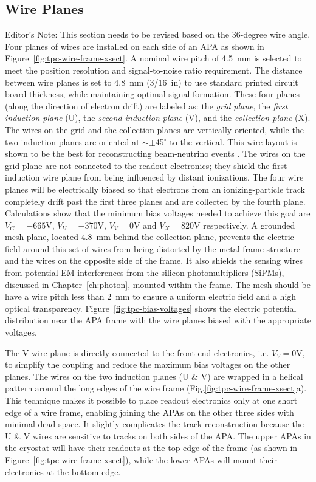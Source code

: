 \subsection{Wire Planes}
\notestart
Editor's Note: This section needs to be revised based on the 36-degree wire angle.
\notestop
Four planes of wires are installed on each side of an APA as shown in Figure~\ref{fig:tpc-wire-frame-xsect}.
A nominal wire pitch of 4.5~mm is selected to meet the position resolution  and signal-to-noise ratio requirement. The distance between wire planes is set to 4.8~mm (3/16~in) to use standard printed circuit board thickness, while maintaining optimal signal formation.  These four planes (along the direction of electron drift) are labeled as: the {\em grid plane}, the {\em first induction plane} (U), the {\em second induction plane} (V), and the {\em collection plane} (X).
The wires on the grid and the collection planes
are vertically oriented, while the two induction planes are oriented 
at $\sim\pm$45$^\circ$ to the vertical. This wire layout is shown to be the best for reconstructing beam-neutrino events \cite{wire-orientation}. The wires on the grid plane are not 
connected to the readout electronics; they shield the first induction wire plane from being influenced by distant ionizations. The four wire planes 
will be electrically biased so that electrons from an ionizing-particle
track completely drift past the first three planes and are collected by the 
fourth plane. Calculations show that the minimum bias voltages 
needed to achieve this goal are $V_G= -665$V, $V_U=-370$V, $V_V=0$V and $V_X=820$V 
respectively.  A grounded mesh plane, located 4.8~mm behind the collection plane, prevents the electric field around this set of wires from being distorted by the metal frame structure and the wires on the opposite side of the frame. It also shields the sensing wires from potential EM interferences from the silicon photomultipliers (SiPMs), discussed in Chapter~\ref{ch:photon}, mounted within the frame.  The mesh should be have a wire pitch less than 2~mm to ensure a uniform electric field and a high optical transparency.  Figure~\ref{fig:tpc-bias-voltages} shows the electric potential distribution near the APA frame with the wire planes biased with the appropriate voltages. 

The V wire plane is directly connected to the front-end electronics, i.e. $V_V=0$V, to simplify the coupling and 
reduce the maximum bias voltages on the other planes. The wires on the two induction planes (U \& V) are wrapped in a helical pattern around the long edges of the wire frame 
(Fig.\ref{fig:tpc-wire-frame-xsect}a). This technique makes it possible to place readout 
electronics only at one short edge of a wire frame, enabling joining the APAs on the other three sides with minimal dead space.  It slightly complicates 
the track reconstruction because the U \& V wires are sensitive to tracks on 
both sides of the APA.  The upper APAs in the cryostat will have their readouts
at the top edge of the frame (as shown in Figure~\ref{fig:tpc-wire-frame-xsect}), 
while the lower APAs will mount their electronics at the bottom edge. 

